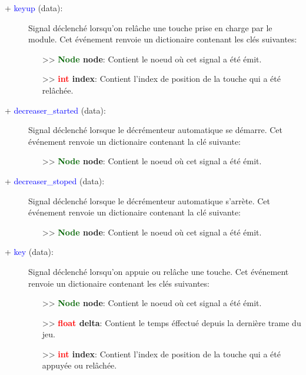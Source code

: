 \documentclass[a4paper, 11pt]{article}
\begin{document}
	\begin{description}
		\item [+ \textcolor{blue}{keyup} (data):] Signal déclenché lorsqu'on relâche une touche prise en 
		charge par le module. Cet événement renvoie un dictionaire contenant les clés suivantes:
		\begin{itemize}
			\item [>> \textbf{\textcolor{darkgreen}{Node} node}:] Contient le noeud où cet signal a été 
			émit.
			\item [>> \textbf{\textcolor{red}{int} index}:] Contient l'index de position de la touche qui a 
			été relâchée.\\
		\end{itemize}
	\end{description}
	\begin{description}
		\item [+ \textcolor{blue}{decreaser\_started} (data):] Signal déclenché lorsque le décrémenteur 
		automatique se démarre. Cet événement renvoie un dictionaire contenant la clé suivante:
		\begin{itemize}
			\item [>> \textbf{\textcolor{darkgreen}{Node} node}:] Contient le noeud où cet signal a été 
			émit.\\
		\end{itemize}
	\end{description}
	\begin{description}
		\item [+ \textcolor{blue}{decreaser\_stoped} (data):] Signal déclenché lorsque le décrémenteur 
		automatique s'arrète. Cet événement renvoie un dictionaire contenant la clé suivante:
		\begin{itemize}
			\item [>> \textbf{\textcolor{darkgreen}{Node} node}:] Contient le noeud où cet signal a été 
			émit.\\
		\end{itemize}
	\end{description}
	\begin{description}
		\item [+ \textcolor{blue}{key} (data):] Signal déclenché lorsqu'on appuie ou relâche une touche. Cet 
		événement renvoie un dictionaire contenant les clés suivantes:
		\begin{itemize}
			\item [>> \textbf{\textcolor{darkgreen}{Node} node}:] Contient le noeud où cet signal a été 
			émit.
			\item [>> \textbf{\textcolor{red}{float} delta}:] Contient le temps éffectué depuis la dernière 
			trame du jeu.
			\item [>> \textbf{\textcolor{red}{int} index}:] Contient l'index de position de la touche qui a 
			été appuyée ou relâchée.\\
		\end{itemize}
	\end{description}
\end{document}
